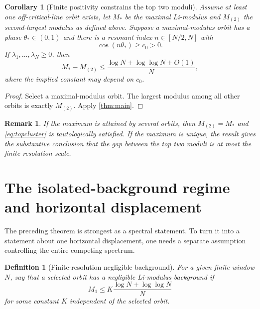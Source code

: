 \documentclass[11pt]{article}
\newtheorem{corollary}[theorem]{Corollary}
\newtheorem{remark}[theorem]{Remark}
\newtheorem{definition}[theorem]{Definition}
\newcommand{\Li}{\lambda}
\begin{document}
\begin{corollary}[Finite positivity constrains the top two moduli]
\label{cor:topcluster}
Assume at least one off-critical-line orbit exists, let \(M_*\) be the maximal Li-modulus and \(M_{(2)}\) the second-largest modulus as defined above. Suppose a maximal-modulus orbit has a phase \(\theta_*
\in(0,1)\) and there is a resonant index \(n\in[N/2,N]\) with
\[
\cos(n\theta_*)\ge c_0>0.
\]
If \(\Li_1,\ldots,\Li_N\ge0\), then
\begin{equation}
M_*-M_{(2)}
\le
\frac{\log N+\log\log N+O(1)}{N},
\label{eq:topcluster}
\end{equation}
where the implied constant may depend on \(c_0\).
\end{corollary}

\begin{proof}
Select a maximal-modulus orbit. The largest modulus among all other orbits is exactly \(M_{(2)}\). Apply \cref{thm:main}.
\end{proof}

\begin{remark}
If the maximum is attained by several orbits, then \(M_{(2)}=M_*\) and \eqref{eq:topcluster} is tautologically satisfied. If the maximum is unique, the result gives the substantive conclusion that the gap between the top two moduli is at most the finite-resolution scale.
\end{remark}

\section{The isolated-background regime and horizontal displacement}

The preceding theorem is strongest as a spectral statement. To turn it into a statement about one horizontal displacement, one needs a separate assumption controlling the entire competing spectrum.

\begin{definition}[Finite-resolution negligible background]
For a given finite window \(N\), say that a selected orbit has a negligible Li-modulus background if
\begin{equation}
M_1
\le
K\frac{\log N+\log\log N}{N}
\label{eq:background}
\end{equation}
for some constant \(K\) independent of the selected orbit.
\end{definition}
\end{document}
